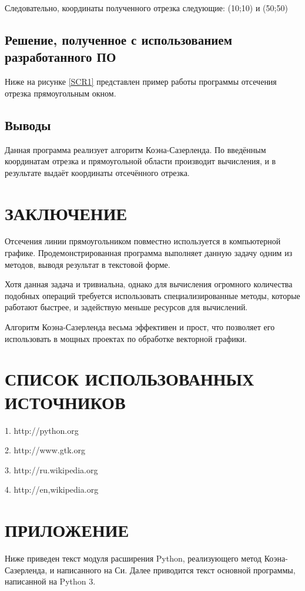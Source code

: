 Следовательно, координаты полученного отрезка следующие: (10;10) и (50;50)
\subsection{Решение, полученное с использованием разработанного ПО}
Ниже на рисунке \ref{SCR1} представлен пример работы программы отсечения отрезка прямоугольным окном.
\subsection{Выводы}
Данная программа реализует алгоритм Коэна-Сазерленда. По введённым координатам отрезка и прямоугольной области производит вычисления, и в результате выдаёт координаты отсечённого отрезка.
\section*{ЗАКЛЮЧЕНИЕ}
Отсечения линии прямоугольником повместно используется в компьютерной графике. Продемонстрированная программа выполняет данную задачу одним из методов, выводя результат в текстовой форме. 

Хотя данная задача и тривиальна, однако для вычисления огромного количества подобных операций требуется использовать специализированные методы, которые работают быстрее, и задействую меньше ресурсов для вычислений.

Алгоритм  Коэна-Сазерленда весьма эффективен и прост, что позволяет его использовать в мощных проектах по обработке векторной графики. 
\section*{СПИСОК ИСПОЛЬЗОВАННЫХ ИСТОЧНИКОВ}
1. http://python.org

2. http://www.gtk.org

3. http://ru.wikipedia.org

4. http://en,wikipedia.org
\section*{ПРИЛОЖЕНИЕ}
Ниже приведен текст модуля расширения Python, реализующего метод Коэна-Сазерленда, и написанного на Си.
Далее приводится текст основной программы, написанной на Python 3.

